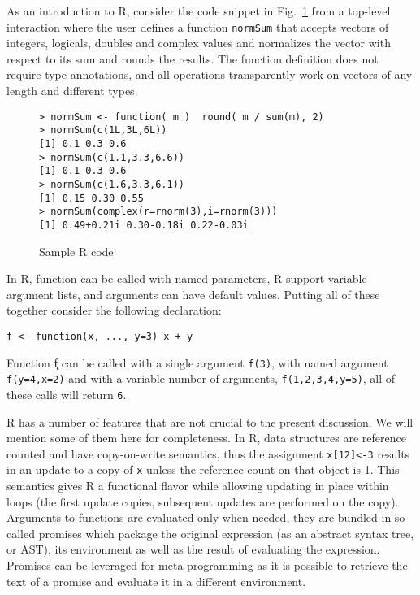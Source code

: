 \documentclass[acmsmall,review,anonymous]{acmart}\settopmatter{printfolios=true,printccs=false,printacmref=false}
\newcommand{\code}[1]{{\lstinline[style=Rin]!#1!}\xspace}
\begin{document}
As an introduction to R, consider the code snippet in Fig.~\ref{sample} from
a top-level interaction where the user defines a function \code{normSum}
that accepts vectors of integers, logicals, doubles and complex values and
normalizes the vector with respect to its sum and rounds the results. The
function definition does not require type annotations, and all operations
transparently work on vectors of any length and different types.

\begin{figure}[!hb]{\small
\begin{lstlisting}
> normSum <- function( m )  round( m / sum(m), 2)
> normSum(c(1L,3L,6L))
[1] 0.1 0.3 0.6
> normSum(c(1.1,3.3,6.6))
[1] 0.1 0.3 0.6
> normSum(c(1.6,3.3,6.1))
[1] 0.15 0.30 0.55
> normSum(complex(r=rnorm(3),i=rnorm(3)))
[1] 0.49+0.21i 0.30-0.18i 0.22-0.03i
\end{lstlisting}}
\caption{Sample R code}\label{sample}
\end{figure}

In R, function can be called with named parameters, R support variable
argument lists, and arguments can have default values. Putting all of these
together consider the following declaration:

\begin{lstlisting}
f <- function(x, ..., y=3) x + y
\end{lstlisting}

\noindent
Function \k{f} can be called with a single argument \code{f(3)}, with named
argument \code{f(y=4,x=2)} and with a variable number of arguments,
\code{f(1,2,3,4,y=5)}, all of these calls will return \code{6}.

R has a number of features that are not crucial to the present
discussion. We will mention some of them here for completeness.  In R, data
structures are reference counted and have copy-on-write semantics, thus the
assignment \code{x[12]<-3} results in an update to a copy of \code{x} unless
the reference count on that object is 1.  This semantics gives R a
functional flavor while allowing updating in place within loops (the first
update copies, subsequent updates are performed on the copy). Arguments to
functions are evaluated only when needed, they are bundled in so-called
promises which package the original expression (as an abstract syntax tree, or AST), its environment
as well as the result of evaluating the expression. Promises can be
leveraged for meta-programming as it is possible to retrieve the text of a
promise and evaluate it in a different environment.
\end{document}
